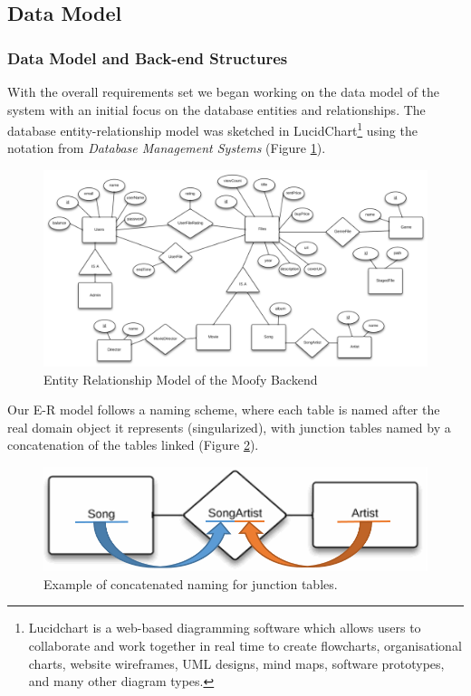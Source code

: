 \subsection{Data Model}
\subsubsection{Data Model and Back-end Structures}
\label{sec:datamodel}

With the overall requirements set we began working on the data model of the system with an initial focus on the database entities and relationships. The database entity-relationship model was sketched in LucidChart\footnote{Lucidchart is a web-based diagramming software which allows users to collaborate and work together in real time to create flowcharts, organisational charts, website wireframes, UML designs, mind maps, software prototypes, and many other diagram types.} using the notation from \emph{Database Management Systems}\cite{dbbook} (Figure \ref{fig:erd}).

\begin{figure}[ht]
	\centering
	\centerline{\includegraphics[scale=0.5]{./p1design/erdmodel.png}}
	\caption{Entity Relationship Model of the Moofy Backend}
	\label{fig:erd}
\end{figure}

Our E-R model follows a naming scheme, where each table is named after the real domain object it represents (singularized), with junction tables named by a concatenation of the tables linked (Figure \ref{fig:junctionfigure}).


\begin{figure}[hbt]
	\centering
	\includegraphics[scale=0.34]{./p1design/junctionfigure.png}
	\caption{Example of concatenated naming for junction tables.}
	\label{fig:junctionfigure}
\end{figure}


